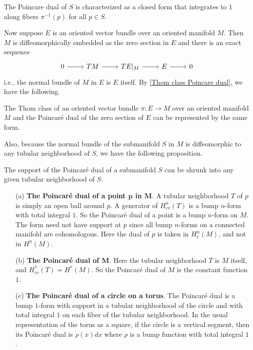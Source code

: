 \begin{corollary}
The Poincare dual of $S$ is characterized as a closed form that integrates to $1$ along fibers $\pi^{-1}(p)$ for all $p\in S$.
\end{corollary}
Now suppose $E$ is an oriented vector bundle over an oriented manifold $M$. Then $M$ is diffeomorphically embedded as the zero section in $E$ and there is an exact sequence
\[\begin{tikzcd}
0\ar[r]&TM\ar[r]&TE|_M\ar[r]&E\ar[r]&0
\end{tikzcd}\]
i.e., the normal bundle of $M$ in $E$ is $E$ itself. By \cref{Thom class Poincare dual}, we have the following.
\begin{corollary}
The Thom class of an oriented vector bundle $\pi:E\to M$ over an oriented manifold $M$ and the Poincar\'e dual of the zero section of $E$ can be represented by the same 
form.
\end{corollary}
Also, because the normal bundle of the submanifold $S$ in $M$ is diffeomorphic to any tubular neighborhood of $S$, we have the following proposition.
\begin{proposition}
The support of the Poincar\'e dual of a submanifold $S$ can be shrunk into any given tubular neighborhood of $S$.
\end{proposition}
\begin{example}
\mbox{}
\begin{itemize}
\item[(a)] \textbf{The Poincar\'e dual of a point $\bm{p}$ in $\bm{M}$}. A tubular neighborhood $T$ of $p$ is simply an open ball around $p$. A generator of $H^n_{cv}(T)$ 
is a bump $n$-form with total integral $1$. So the Poincar\'e dual of a point is a bump $n$-form on $M$. The form need not have support at $p$ since all bump $n$-forms on 
a connected manifold are cohomologous. Here the dual of $p$ is taken in $H^n_{c}(M)$, and not in $H^n(M)$.
\item[(b)] \textbf{The Poincar\'e dual of $\bm{M}$}. Here the tubular neighborhood $T$ is $M$ itself, and $H^*_{cv}(T)=H^*(M)$. So the Poincar\'e dual of $M$ is the 
constant function $1$.
\item[(c)] \textbf{The Poincar\'e dual of a circle on a torus}. The Poincar\'e dual is a bump $1$-form with support in a tubular neighborhood of the circle and with 
total integral $1$ on each fiber of the tubular neighborhood. In the usual representation of the torus as a square, if the circle is a vertical segment, then its 
Poincar\'e dual is $\rho(x)dx$ where $\rho$ is a bump function with total integral $1$.
\end{itemize}
\end{example}
